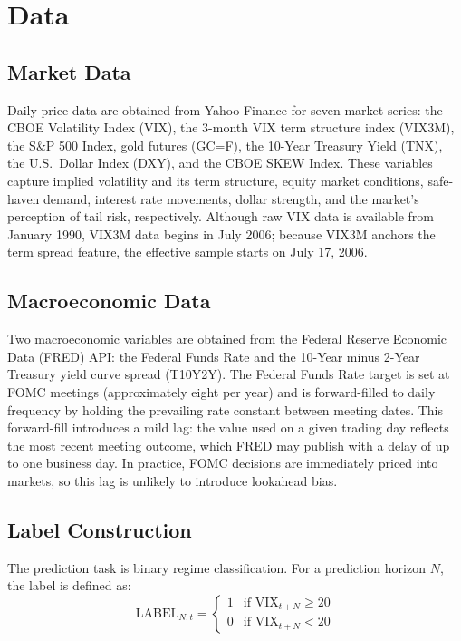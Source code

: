 \documentclass[12pt]{article}
\begin{document}
\section{Data}
\label{sec:data}

\subsection{Market Data}

Daily price data are obtained from Yahoo Finance for seven market series: the CBOE Volatility Index (VIX), the 3-month VIX term structure index (VIX3M), the S\&P 500 Index, gold futures (GC=F), the 10-Year Treasury Yield (TNX), the U.S.\ Dollar Index (DXY), and the CBOE SKEW Index. These variables capture implied volatility and its term structure, equity market conditions, safe-haven demand, interest rate movements, dollar strength, and the market's perception of tail risk, respectively. Although raw VIX data is available from January 1990, VIX3M data begins in July 2006; because VIX3M anchors the term spread feature, the effective sample starts on July 17, 2006.

\subsection{Macroeconomic Data}

Two macroeconomic variables are obtained from the Federal Reserve Economic Data (FRED) API: the Federal Funds Rate and the 10-Year minus 2-Year Treasury yield curve spread (T10Y2Y). The Federal Funds Rate target is set at FOMC meetings (approximately eight per year) and is forward-filled to daily frequency by holding the prevailing rate constant between meeting dates. This forward-fill introduces a mild lag: the value used on a given trading day reflects the most recent meeting outcome, which FRED may publish with a delay of up to one business day. In practice, FOMC decisions are immediately priced into markets, so this lag is unlikely to introduce lookahead bias.

\subsection{Label Construction}

The prediction task is binary regime classification. For a prediction horizon $N$, the label is defined as:
\begin{equation}
    \text{LABEL}_{N,t} = \begin{cases} 1 & \text{if } \text{VIX}_{t+N} \geq 20 \\ 0 & \text{if } \text{VIX}_{t+N} < 20 \end{cases}
    \label{eq:label}
\end{equation}
\end{document}
